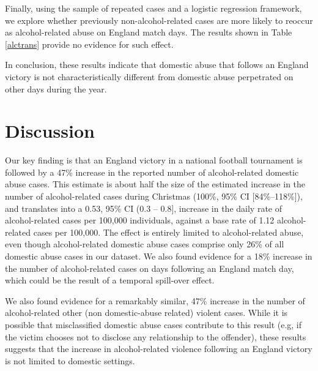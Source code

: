 \documentclass[12pt, a4paper]{article}
\begin{document}



Finally, using the sample of repeated cases and a logistic regression framework, we explore whether previously non-alcohol-related cases are more likely to reoccur as alcohol-related abuse on England match days. The results shown in Table \ref{alctrans} provide no evidence for such effect. 

In conclusion, these results indicate that domestic abuse that follows an England victory is not characteristically different from domestic abuse perpetrated on other days during the year.

\clearpage

\section*{Discussion}

Our key finding is that an England victory in a national football tournament is followed by a 47\% increase in the reported number of alcohol-related domestic abuse cases. This estimate is about half the size of the estimated increase in the number of alcohol-related cases during Christmas (100\%, 95\% CI [84\%--118\%]), and translates into a 0.53, 95\% CI (0.3 -- 0.8], increase in the daily rate of alcohol-related cases per 100,000 individuals, against a base rate of 1.12 alcohol-related cases per 100,000. The effect is entirely limited to alcohol-related abuse, even though alcohol-related domestic abuse cases comprise only 26\% of all domestic abuse cases in our dataset. We also found evidence for a 18\% increase in the number of alcohol-related cases on days following an England match day, which could be the result of a temporal spill-over effect.


We also found evidence for a remarkably similar, 47\% increase in the number of alcohol-related other (non domestic-abuse related) violent cases. While it is possible that misclassified domestic abuse cases contribute to this result (e.g, if the victim chooses not to disclose any relationship to the offender), these results suggests that the increase in alcohol-related violence following an England victory is not limited to domestic settings. 
\end{document}
